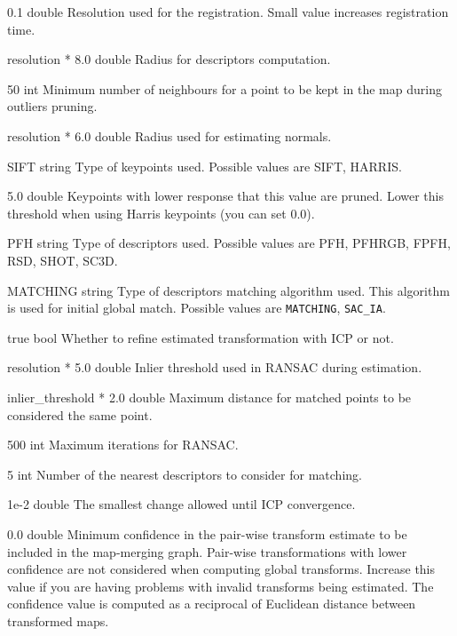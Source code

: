 {0.1}
{double}
{Resolution used for the registration. Small value increases registration time.}

{resolution * 8.0}
{double}
{Radius for descriptors computation.}

{50}
{int}
{Minimum number of neighbours for a point to be kept in the map during outliers pruning.}

{resolution * 6.0}
{double}
{Radius used for estimating normals.}

{SIFT}
{string}
{Type of keypoints used. Possible values are \gls{SIFT}, HARRIS.}

{5.0}
{double}
{Keypoints with lower response that this value are pruned. Lower this threshold when using Harris keypoints (you can set $0.0$).}

{PFH}
{string}
{Type of descriptors used. Possible values are \gls{PFH}, \gls{PFHRGB}, \gls{FPFH}, \gls{RSD}, \gls{SHOT}, \gls{SC3D}.}

{MATCHING}
{string}
{Type of descriptors matching algorithm used. This algorithm is used for initial global match. Possible values are \texttt{MATCHING}, \texttt{SAC\_IA}.}

{true}
{bool}
{Whether to refine estimated transformation with \gls{ICP} or not.}

{resolution * 5.0}
{double}
{Inlier threshold used in \gls{RANSAC} during estimation.}

{inlier\_threshold * 2.0}
{double}
{Maximum distance for matched points to be considered the same point.}

{500}
{int}
{Maximum iterations for \gls{RANSAC}.}

{5}
{int}
{Number of the nearest descriptors to consider for matching.}

{1e-2}
{double}
{The smallest change allowed until \gls{ICP} convergence.}

{0.0}
{double}
{Minimum confidence in the pair-wise transform estimate to be included in the map-merging graph. Pair-wise transformations with lower confidence are not considered when computing global transforms. Increase this value if you are having problems with invalid transforms being estimated. The confidence value is computed as a reciprocal of Euclidean distance between transformed maps.}

